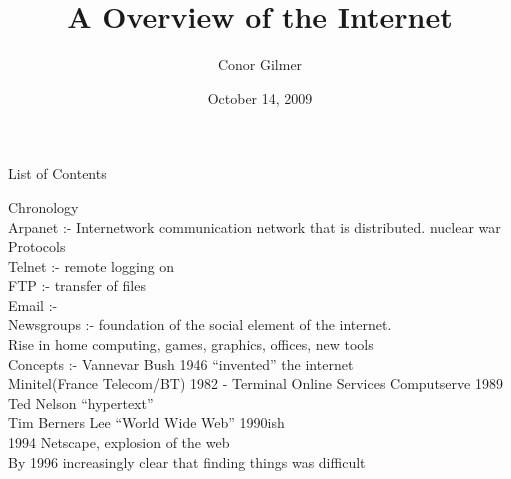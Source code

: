 \documentclass[30pt,landscape,footrule]{foils}
\title{A Overview of the Internet}
\author{Conor Gilmer}
\date{October 14, 2009}
\begin{document}
\maketitle
\parindent 0mm\raggedright

List of Contents
\begin{itemize}
\small{
	\item {} \qquad
	\item {} \qquad
	\item {} \qquad
	\item {} \qquad
	\item {} \qquad
	\item {} \par	
}
\end{itemize}


Chronology\\
Arpanet :- Internetwork communication network that is distributed. nuclear war\\
Protocols\\
Telnet :- remote logging on\\
FTP :- transfer of files\\
Email :-\\
Newsgroups :- foundation of the social element of the internet.\\

Rise in home computing, games, graphics, offices, new tools\\
Concepts :-  Vannevar Bush 1946 ``invented'' the internet\\
Minitel(France Telecom/BT) 1982 - Terminal Online Services
Computserve 1989
Ted Nelson ``hypertext''\\
Tim Berners Lee ``World Wide Web'' 1990ish\\
1994 Netscape, explosion of the web\\
By 1996 increasingly clear that finding things was difficult\\
\end{document}
